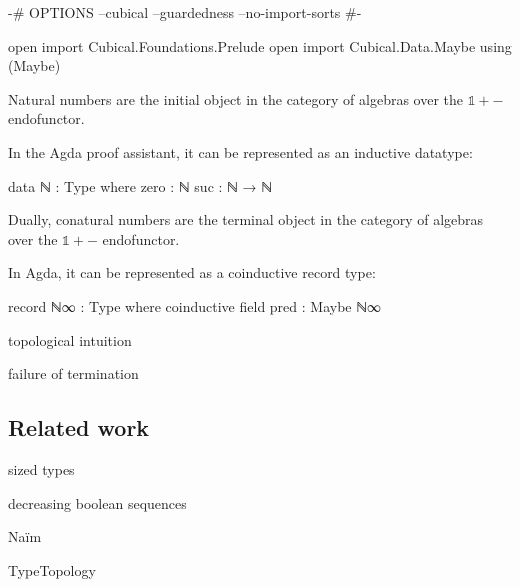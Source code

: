 \begin{code}[hide]
{-# OPTIONS --cubical --guardedness --no-import-sorts #-}

open import Cubical.Foundations.Prelude
open import Cubical.Data.Maybe using (Maybe)
\end{code}

Natural numbers are the initial object in the category of algebras over the
$\mathbb{1} + {-}$ endofunctor.

In the Agda proof assistant, it can be represented as an inductive datatype:

\begin{code}
data ℕ : Type where
  zero  : ℕ
  suc   : ℕ → ℕ
\end{code}

Dually, conatural numbers are the terminal object in the category of algebras
over the $\mathbb{1} + {-}$ endofunctor.

In Agda, it can be represented as a coinductive record type:

\begin{code}
record ℕ∞ : Type where
  coinductive
  field
    pred : Maybe ℕ∞
\end{code}

topological intuition

\begin{figure}[h]
\end{figure}

failure of termination

\subsection{Related work}

sized types

decreasing boolean sequences

Naïm

TypeTopology

